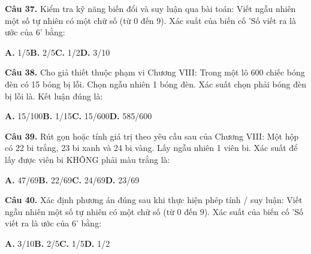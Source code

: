 \documentclass[11pt,a4paper]{article}
\begin{document}
\textbf{\color{primary} Câu 37.} Kiểm tra kỹ năng biến đổi và suy luận qua bài toán: Viết ngẫu nhiên một số tự nhiên có một chữ số (từ 0 đến 9). Xác suất của biến cố 'Số viết ra là ước của 6' bằng:\par
\hspace*{1.5em}\textbf{A.} 1/5\quad\quad \textbf{B.} 2/5\quad\quad \textbf{C.} 1/2\quad\quad \textbf{D.} 3/10\par\vspace{2pt}
\textbf{\color{primary} Câu 38.} Cho giả thiết thuộc phạm vi Chương VIII: Trong một lô 600 chiếc bóng đèn có 15 bóng bị lỗi. Chọn ngẫu nhiên 1 bóng đèn. Xác suất chọn phải bóng đèn bị lỗi là. Kết luận đúng là:\par
\hspace*{1.5em}\textbf{A.} 15/100\quad\quad \textbf{B.} 1/15\quad\quad \textbf{C.} 15/600\quad\quad \textbf{D.} 585/600\par\vspace{2pt}
\textbf{\color{primary} Câu 39.} Rút gọn hoặc tính giá trị theo yêu cầu sau của Chương VIII: Một hộp có 22 bi trắng, 23 bi xanh và 24 bi vàng. Lấy ngẫu nhiên 1 viên bi. Xác suất để lấy được viên bi KHÔNG phải màu trắng là:\par
\hspace*{1.5em}\textbf{A.} 47/69\quad\quad \textbf{B.} 22/69\quad\quad \textbf{C.} 24/69\quad\quad \textbf{D.} 23/69\par\vspace{2pt}
\textbf{\color{primary} Câu 40.} Xác định phương án đúng sau khi thực hiện phép tính / suy luận: Viết ngẫu nhiên một số tự nhiên có một chữ số (từ 0 đến 9). Xác suất của biến cố 'Số viết ra là ước của 6' bằng:\par
\hspace*{1.5em}\textbf{A.} 3/10\quad\quad \textbf{B.} 2/5\quad\quad \textbf{C.} 1/5\quad\quad \textbf{D.} 1/2\par\vspace{2pt}
\end{document}
